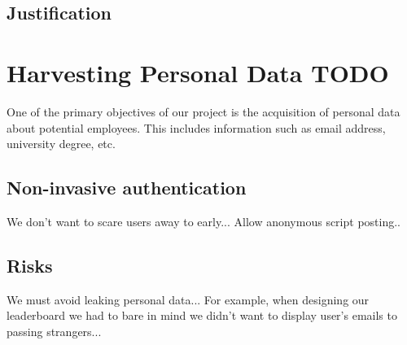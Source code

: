 \subsection{Justification}


\section{Harvesting Personal Data TODO}
One of the primary objectives of our project is the acquisition of personal data about potential employees. This includes information such as email address, university degree, etc. 
\subsection{Non-invasive authentication}
We don't want to scare users away to early...
Allow anonymous script posting..
\subsection{Risks}
We must avoid leaking personal data...
For example, when designing our leaderboard we had to bare in mind we didn't want to display user's emails to passing strangers...


